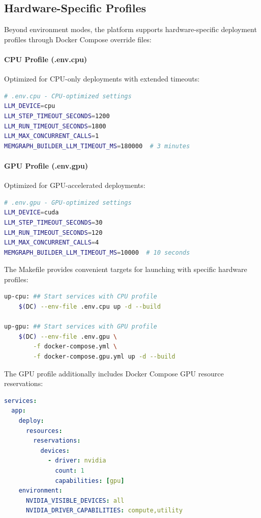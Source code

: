 \subsection{Hardware-Specific Profiles}

Beyond environment modes, the platform supports hardware-specific deployment profiles through Docker Compose override files:

\paragraph{CPU Profile (.env.cpu)}
Optimized for CPU-only deployments with extended timeouts:

\begin{lstlisting}[language=bash, caption=CPU profile configuration]
# .env.cpu - CPU-optimized settings
LLM_DEVICE=cpu
LLM_STEP_TIMEOUT_SECONDS=1200
LLM_RUN_TIMEOUT_SECONDS=1800
LLM_MAX_CONCURRENT_CALLS=1
MEMGRAPH_BUILDER_LLM_TIMEOUT_MS=180000  # 3 minutes
\end{lstlisting}

\paragraph{GPU Profile (.env.gpu)}
Optimized for GPU-accelerated deployments:

\begin{lstlisting}[language=bash, caption=GPU profile configuration]
# .env.gpu - GPU-optimized settings
LLM_DEVICE=cuda
LLM_STEP_TIMEOUT_SECONDS=30
LLM_RUN_TIMEOUT_SECONDS=120
LLM_MAX_CONCURRENT_CALLS=4
MEMGRAPH_BUILDER_LLM_TIMEOUT_MS=10000  # 10 seconds
\end{lstlisting}

The Makefile provides convenient targets for launching with specific hardware profiles:

\begin{lstlisting}[language=bash, caption=Makefile targets for hardware profiles]
up-cpu: ## Start services with CPU profile
    $(DC) --env-file .env.cpu up -d --build

up-gpu: ## Start services with GPU profile
    $(DC) --env-file .env.gpu \
        -f docker-compose.yml \
        -f docker-compose.gpu.yml up -d --build
\end{lstlisting}

The GPU profile additionally includes Docker Compose GPU resource reservations:

\begin{lstlisting}[language=yaml, caption=GPU resource reservation in docker-compose.gpu.yml]
services:
  app:
    deploy:
      resources:
        reservations:
          devices:
            - driver: nvidia
              count: 1
              capabilities: [gpu]
    environment:
      NVIDIA_VISIBLE_DEVICES: all
      NVIDIA_DRIVER_CAPABILITIES: compute,utility
\end{lstlisting}

